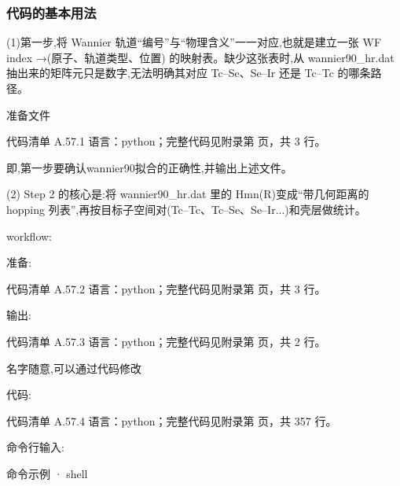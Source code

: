 \documentclass[lang=cn,scheme=chinese,color=blue,device=normal,toc=onecol,math=cm]{elegantbook}
\begin{document}
\subsubsection{代码的基本用法}


(1)第一步,将 Wannier 轨道“编号”与“物理含义”一一对应,也就是建立一张 WF index →(原子、轨道类型、位置) 的映射表。缺少这张表时,从 wannier90\_\allowbreak{}hr.dat 抽出来的矩阵元只是数字,无法明确其对应 Tc–Se、Se–Ir 还是 Tc–Tc 的哪条路径。\par


准备文件\par


\begin{codeindexbox}{代码清单 A.57.1}
语言：python；完整代码见附录第 \pageref{code:57:1} 页，共 3 行。
\end{codeindexbox}


即,第一步要确认wannier90拟合的正确性,并输出上述文件。\par


(2) Step 2 的核心是:将 wannier90\_\allowbreak{}hr.dat 里的 Hmn(R)变成“带几何距离的 hopping 列表”,再按目标子空间对(Tc–Tc、Tc–Se、Se–Ir...)和壳层做统计。\par


workflow:\par


准备:\par


\begin{codeindexbox}{代码清单 A.57.2}
语言：python；完整代码见附录第 \pageref{code:57:2} 页，共 3 行。
\end{codeindexbox}


输出:\par


\begin{codeindexbox}{代码清单 A.57.3}
语言：python；完整代码见附录第 \pageref{code:57:3} 页，共 2 行。
\end{codeindexbox}


名字随意,可以通过代码修改\par


代码:\par


\begin{codeindexbox}{代码清单 A.57.4}
语言：python；完整代码见附录第 \pageref{code:57:4} 页，共 357 行。
\end{codeindexbox}


命令行输入:\par


\begin{inlinecodebox}{命令示例 · shell}
\end{inlinecodebox}
\end{document}
